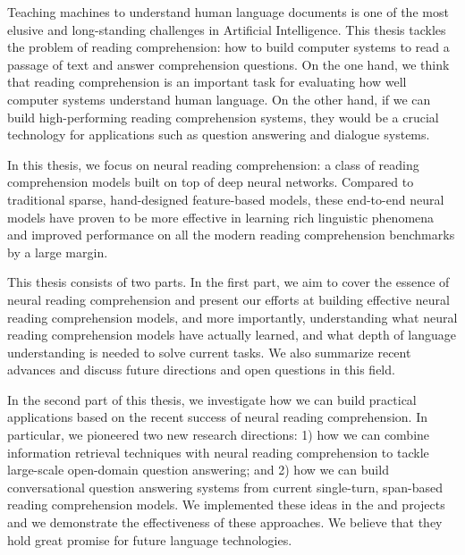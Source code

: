 

Teaching machines to understand human language documents is one of the most elusive and long-standing challenges in Artificial Intelligence. This thesis tackles the problem of reading comprehension: how to build computer systems to read a passage of text and answer  comprehension questions. On the one hand, we think that reading comprehension is an important task for evaluating how well computer systems understand human language. On the other hand, if we can build high-performing reading comprehension systems, they would be a crucial technology for applications such as question answering and dialogue systems.

In this thesis, we focus on neural reading comprehension: a class of reading comprehension models built on top of deep neural networks. Compared to traditional sparse, hand-designed feature-based models, these end-to-end neural models have proven to be more effective in learning rich linguistic phenomena and improved performance on all the modern reading comprehension benchmarks by a large margin.

This thesis consists of two parts. In the first part, we aim to cover the essence of neural reading comprehension and present our efforts at building effective neural reading comprehension models, and more importantly, understanding what neural reading comprehension models have actually learned, and what depth of language understanding is needed to solve current tasks. We also summarize recent advances and discuss future directions and open questions in this field.

In the second part of this thesis, we investigate how we can build practical applications based on the recent success of neural reading comprehension. In particular, we pioneered two new research directions: 1) how we can combine information retrieval techniques with neural reading comprehension to tackle large-scale open-domain question answering; and 2) how we can build conversational question answering systems from current single-turn, span-based reading comprehension models. We implemented these ideas in the  and  projects and we demonstrate the effectiveness of these approaches. We believe that they hold great promise for future language technologies.
